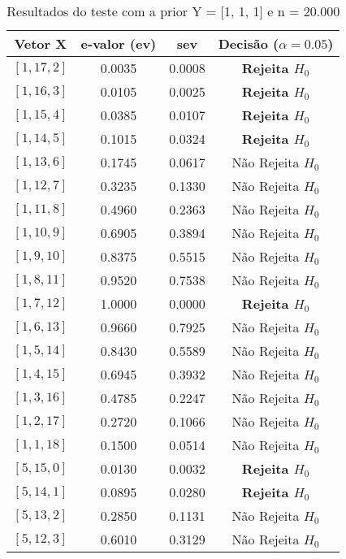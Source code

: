 \documentclass[12pt, a4paper]{article}
\begin{document}
\begin{table}[H]
    \centering
    \caption{Resultados do teste com a prior Y = [1, 1, 1] e n = 20.000}
    \label{tab:prior1-nova}
    \begin{tabular}{cccc}
        \toprule
        \textbf{Vetor X} & \textbf{e-valor (ev)} & \textbf{sev} & \textbf{Decisão ($\alpha=0.05$)} \\
        \midrule
        {$[1, 17, 2]$} & 0.0035 & 0.0008 & \textbf{Rejeita $H_0$} \\
        {$[1, 16, 3]$} & 0.0105 & 0.0025 & \textbf{Rejeita $H_0$} \\
        {$[1, 15, 4]$} & 0.0385 & 0.0107 & \textbf{Rejeita $H_0$} \\
        {$[1, 14, 5]$} & 0.1015 & 0.0324 & \textbf{Rejeita $H_0$} \\
        {$[1, 13, 6]$} & 0.1745 & 0.0617 & Não Rejeita $H_0$ \\
        {$[1, 12, 7]$} & 0.3235 & 0.1330 & Não Rejeita $H_0$ \\
        {$[1, 11, 8]$} & 0.4960 & 0.2363 & Não Rejeita $H_0$ \\
        {$[1, 10, 9]$} & 0.6905 & 0.3894 & Não Rejeita $H_0$ \\
        {$[1, 9, 10]$} & 0.8375 & 0.5515 & Não Rejeita $H_0$ \\
        {$[1, 8, 11]$} & 0.9520 & 0.7538 & Não Rejeita $H_0$ \\
        {$[1, 7, 12]$} & 1.0000 & 0.0000 & \textbf{Rejeita $H_0$} \\
        {$[1, 6, 13]$} & 0.9660 & 0.7925 & Não Rejeita $H_0$ \\
        {$[1, 5, 14]$} & 0.8430 & 0.5589 & Não Rejeita $H_0$ \\
        {$[1, 4, 15]$} & 0.6945 & 0.3932 & Não Rejeita $H_0$ \\
        {$[1, 3, 16]$} & 0.4785 & 0.2247 & Não Rejeita $H_0$ \\
        {$[1, 2, 17]$} & 0.2720 & 0.1066 & Não Rejeita $H_0$ \\
        {$[1, 1, 18]$} & 0.1500 & 0.0514 & Não Rejeita $H_0$ \\
        \midrule
        {$[5, 15, 0]$} & 0.0130 & 0.0032 & \textbf{Rejeita $H_0$} \\
        {$[5, 14, 1]$} & 0.0895 & 0.0280 & \textbf{Rejeita $H_0$} \\
        {$[5, 13, 2]$} & 0.2850 & 0.1131 & Não Rejeita $H_0$ \\
        {$[5, 12, 3]$} & 0.6010 & 0.3129 & Não Rejeita $H_0$ \\

\end{tabular}
\end{table}
\end{document}
